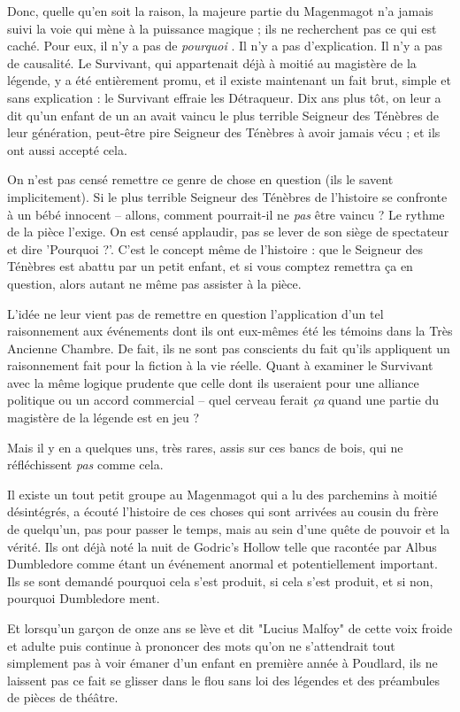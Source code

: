 Donc, quelle qu'en soit la raison, la majeure partie du Magenmagot n'a jamais suivi la voie qui mène à la puissance magique ; ils ne recherchent pas ce qui est caché. Pour eux, il n'y a pas de \emph{pourquoi} . Il n'y a pas d'explication. Il n'y a pas de causalité. Le Survivant, qui appartenait déjà à moitié au magistère de la légende, y a été entièrement promu, et il existe maintenant un fait brut, simple et sans explication : le Survivant effraie les Détraqueur. Dix ans plus tôt, on leur a dit qu'un enfant de un an avait vaincu le plus terrible Seigneur des Ténèbres de leur génération, peut-être pire Seigneur des Ténèbres à avoir jamais vécu ; et ils ont aussi accepté cela.

On n'est pas censé remettre ce genre de chose en question (ils le savent implicitement). Si le plus terrible Seigneur des Ténèbres de l'histoire se confronte à un bébé innocent – allons, comment pourrait-il ne \emph{pas}  être vaincu ? Le rythme de la pièce l'exige. On est censé applaudir, pas se lever de son siège de spectateur et dire 'Pourquoi ?'. C'est le concept même de l'histoire : que le Seigneur des Ténèbres est abattu par un petit enfant, et si vous comptez remettra ça en question, alors autant ne même pas assister à la pièce.

L'idée ne leur vient pas de remettre en question l'application d'un tel raisonnement aux événements dont ils ont eux-mêmes été les témoins dans la Très Ancienne Chambre. De fait, ils ne sont pas conscients du fait qu'ils appliquent un raisonnement fait pour la fiction à la vie réelle. Quant à examiner le Survivant avec la même logique prudente que celle dont ils useraient pour une alliance politique ou un accord commercial – quel cerveau ferait \emph{ça}  quand une partie du magistère de la légende est en jeu ?

Mais il y en a quelques uns, très rares, assis sur ces bancs de bois, qui ne réfléchissent \emph{pas}  comme cela.

Il existe un tout petit groupe au Magenmagot qui a lu des parchemins à moitié désintégrés, a écouté l'histoire de ces choses qui sont arrivées au cousin du frère de quelqu'un, pas pour passer le temps, mais au sein d'une quête de pouvoir et la vérité. Ils ont déjà noté la nuit de Godric's Hollow telle que racontée par Albus Dumbledore comme étant un événement anormal et potentiellement important. Ils se sont demandé pourquoi cela s'est produit, si cela s'est produit, et si non, pourquoi Dumbledore ment.

Et lorsqu'un garçon de onze ans se lève et dit "Lucius Malfoy" de cette voix froide et adulte puis continue à prononcer des mots qu'on ne s'attendrait tout simplement pas à voir émaner d'un enfant en première année à Poudlard, ils ne laissent pas ce fait se glisser dans le flou sans loi des légendes et des préambules de pièces de théâtre.

